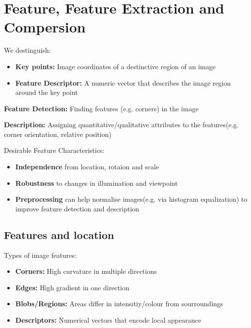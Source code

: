 \section{Feature, Feature Extraction and Compersion}
We destinguish:
\begin{itemize}
    \item \textbf{Key points:} Image coordinates of a destinctive region of an image
    \item \textbf{Feature Descriptor:} A numeric vector that describes the image region around the key point
\end{itemize}
\textbf{Feature Detection:} Finding features (e.g. corners) in the image

\textbf{Description:} Assigning quantitative/qualitative attributes to the features(e.g. corner orientation, relative position)


Desirable Feature Characteristics:
\begin{itemize}
    \item \textbf{Independence} from location, rotaion and scale
    \item \textbf{Robustness} to changes in illumination and viewpoint
    \item \textbf{Preprocessing} can help normalise images(e.g. via histogram equalization) to improve feature detection and description
\end{itemize}

\subsection{Features and location}
Types of image features:
\begin{itemize}
    \item \textbf{Corners:} High curvature in multiple directions
    \item \textbf{Edges:} High gradient in one direction
    \item \textbf{Blobs/Regions:} Areas differ in intensitiy/colour from sourroundings
    \item \textbf{Descriptors:} Numerical vectors that encode local appearance
\end{itemize}

